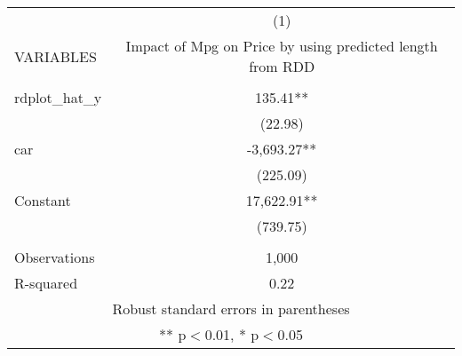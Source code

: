 \begin{tabular}{lc} \hline
 & (1) \\
VARIABLES & Impact of Mpg on Price by using predicted length from RDD \\ \hline
 &  \\
rdplot\_hat\_y & 135.41** \\
 & (22.98) \\
car & -3,693.27** \\
 & (225.09) \\
Constant & 17,622.91** \\
 & (739.75) \\
 &  \\
Observations & 1,000 \\
 R-squared & 0.22 \\ \hline
\multicolumn{2}{c}{ Robust standard errors in parentheses} \\
\multicolumn{2}{c}{ ** p$<$0.01, * p$<$0.05} \\
\end{tabular}
